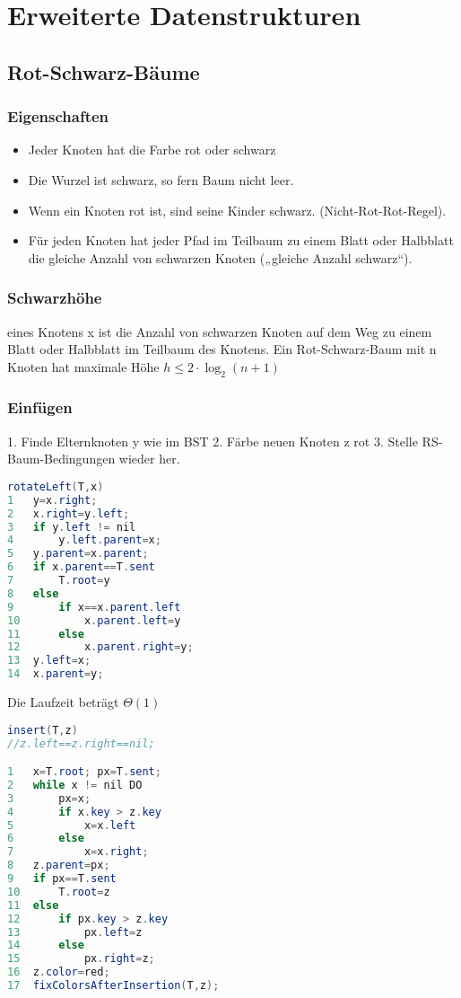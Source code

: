 \documentclass[jou,apacite]{apa6}
\begin{document}
\section{Erweiterte Datenstrukturen}

\subsection{Rot-Schwarz-Bäume}
\subsubsection{Eigenschaften}
\begin{itemize}
    \item Jeder Knoten hat die Farbe rot oder schwarz
    \item Die Wurzel ist schwarz, so fern Baum nicht leer.
    \item Wenn ein Knoten rot ist, sind seine Kinder schwarz. (\dq Nicht-Rot-Rot\dq -Regel).
    \item Für jeden Knoten hat jeder Pfad im Teilbaum zu einem Blatt oder Halbblatt die gleiche Anzahl von schwarzen Knoten („gleiche Anzahl schwarz“).
\end{itemize}

\subsubsection{Schwarzhöhe} eines Knotens x ist die Anzahl von schwarzen Knoten auf dem Weg zu einem Blatt oder Halbblatt im Teilbaum des Knotens. Ein Rot-Schwarz-Baum mit n Knoten hat maximale Höhe $h\le2\cdot\log_2(n+1)$

\subsubsection{Einfügen} 1. Finde Elternknoten y wie im BST 2. Färbe neuen Knoten z rot 3. Stelle RS-Baum-Bedingungen wieder her. 
\begin{lstlisting}[language=java]
rotateLeft(T,x)
1   y=x.right;
2   x.right=y.left;
3   if y.left != nil 
4       y.left.parent=x;
5   y.parent=x.parent;
6   if x.parent==T.sent 
7       T.root=y
8   else
9       if x==x.parent.left 
10          x.parent.left=y
11      else
12          x.parent.right=y;
13  y.left=x;
14  x.parent=y;
\end{lstlisting}
Die Laufzeit beträgt $\Theta(1)$

\begin{lstlisting}[language=java]
insert(T,z)
//z.left==z.right==nil;

1   x=T.root; px=T.sent;
2   while x != nil DO
3       px=x;
4       if x.key > z.key 
5           x=x.left
6       else
7           x=x.right;
8   z.parent=px;
9   if px==T.sent 
10      T.root=z
11  else
12      if px.key > z.key 
13          px.left=z
14      else
15          px.right=z;
16  z.color=red;
17  fixColorsAfterInsertion(T,z);
\end{lstlisting}
\end{document}
